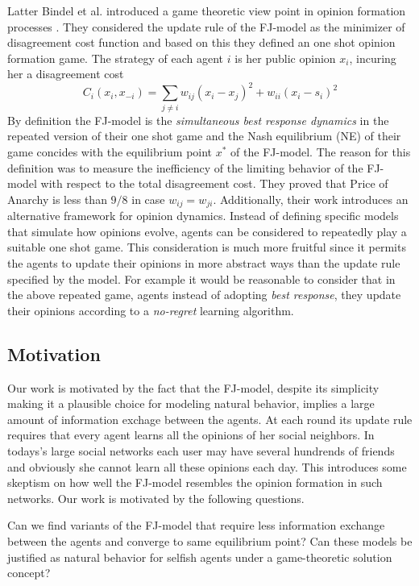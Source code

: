 Latter Bindel et al. introduced a game theoretic
view point in opinion formation processes \cite{BKO11}.
They considered the update rule of the FJ-model
as the minimizer of disagreement cost function
and based on this they defined an one shot
opinion formation game. The strategy of each agent $i$ is
her public opinion $x_i$, incuring her a
disagreement cost
%
\begin{equation}\label{eq:BKO_cost}
  C_i(x_i,x_{-i})=
  \sum_{j \neq i}w_{ij} (x_i-x_j)^2 + w_{ii}(x_i-s_i)^2
\end{equation}
%
By definition the FJ-model is the
\emph{simultaneous best response dynamics} in the repeated
version of their one shot game and the Nash equilibrium (NE)
of their game concides with the equilibrium point
$x^*$ of the FJ-model. The reason for this definition
was to measure the inefficiency of the limiting behavior
of the FJ-model with respect to the total disagreement cost.
They proved that Price of Anarchy is less than $9/8$
in case $w_{ij}=w_{ji}$. Additionally, their work introduces
an alternative framework for opinion dynamics.
Instead of defining specific models that
simulate how opinions evolve, agents can be considered to repeatedly
play a suitable one shot game. This consideration is
much more fruitful since it permits the agents to
update their opinions in more abstract ways than
the update rule specified by the model.
For example it would be reasonable to consider
that in the above repeated game, agents instead of
adopting \emph{best response}, they update their opinions according
to a \emph{no-regret} learning algorithm.

\subsection{Motivation}
Our work is motivated by the fact that the FJ-model,
despite its simplicity making it a plausible choice
for modeling natural behavior, implies a large amount of
information exchage between the agents. At each round
its update rule requires that every agent learns all the
opinions of her social neighbors.
In todays's large social networks each user
may have several hundrends of friends and obviously
she cannot learn all these opinions each day.
This introduces some skeptism on how well the
FJ-model resembles the opinion formation in such
networks. Our work is motivated by the following 
questions.

\begin{question}
Can we find variants of the FJ-model that
require less information exchange between the agents
and converge to same equilibrium point?
Can these models be justified as natural behavior for selfish
agents under a game-theoretic solution concept?
\end{question}


